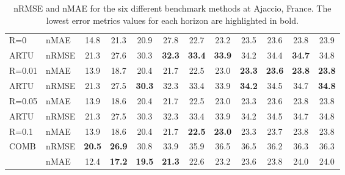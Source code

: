 \begin{table}[tb]
\begin{tabular}{@{}llcccccccccc@{}}
R=0     & nMAE      & 14.8          & 21.3          & 20.9          & 27.8          & 22.7          & 23.2          & 23.5          & 23.6          & 23.8          & 23.9          \\ \addlinespace 
ARTU     & nRMSE     & 21.3          & 27.6          & 30.3          & \textbf{32.3} & \textbf{33.4} & \textbf{33.9} & 34.2          & 34.4          & \textbf{34.7} & 34.8          \\  
R=0.01  & nMAE      & 13.9          & 18.7          & 20.4          & 21.7          & 22.5          & 23.0          & \textbf{23.3} & \textbf{23.6} & \textbf{23.8} & \textbf{23.8} \\ \addlinespace 
ARTU     & nRMSE     & 21.3          & 27.5          & \textbf{30.3} & 32.3          & 33.4          & 33.9          & \textbf{34.2} & 34.5          & 34.7          & \textbf{34.8} \\  
R=0.05  & nMAE      & 13.9          & 18.6          & 20.4          & 21.7          & 22.5          & 23.0          & 23.3          & 23.6          & 23.8          & 23.8          \\ \addlinespace 
ARTU     & nRMSE     & 21.3          & 27.5          & 30.3          & 32.3          & 33.4          & 33.9          & 34.2          & 34.5          & 34.7          & 34.8          \\  
R=0.1   & nMAE      & 13.9          & 18.6          & 20.4          & 21.7          & \textbf{22.5} & \textbf{23.0} & 23.3          & 23.7          & 23.8          & 23.8          \\ \addlinespace 
COMB     & nRMSE     & \textbf{20.5} & \textbf{26.9} & 30.8          & 33.9          & 35.9          & 36.5          & 36.5          & 36.2          & 36.3          & 36.3          \\  
         & nMAE      & 12.4          & \textbf{17.2} & \textbf{19.5} & \textbf{21.3} & 22.6          & 23.2          & 23.6          & 23.8          & 24.0          & 24.0          \\ \bottomrule
\end{tabular}
\caption{nRMSE and nMAE for the six different benchmark methods at Ajaccio, France. The lowest error metrics values for each horizon are highlighted in bold.}\label{tab:1a}




\end{table}

